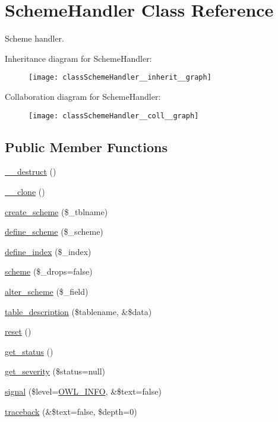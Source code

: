\section{SchemeHandler Class Reference}
\label{classSchemeHandler}


Scheme handler.  




Inheritance diagram for SchemeHandler:\nopagebreak
\begin{figure}[H]
\begin{center}
\leavevmode
\texttt{[image: classSchemeHandler\_\_inherit\_\_graph]}
\end{center}
\end{figure}


Collaboration diagram for SchemeHandler:\nopagebreak
\begin{figure}[H]
\begin{center}
\leavevmode
\texttt{[image: classSchemeHandler\_\_coll\_\_graph]}
\end{center}
\end{figure}
\subsection*{Public Member Functions}
\begin{DoxyCompactItemize}
\item 
\hyperlink{classSchemeHandler_a3d786efe6ef92858de21438b59774226}{\_\-\_\-destruct} ()
\item 
\hyperlink{classSchemeHandler_af0a48894ea6bb36f3149ccd40bf37681}{\_\-\_\-clone} ()
\item 
\hyperlink{classSchemeHandler_ae00497936108b220b41af512774cfc16}{create\_\-scheme} (\$\_\-tblname)
\item 
\hyperlink{classSchemeHandler_a07f6b7c5ac78e88f32584b90da53776b}{define\_\-scheme} (\$\_\-scheme)
\item 
\hyperlink{classSchemeHandler_a92adefff835050da61337524b9ae907b}{define\_\-index} (\$\_\-index)
\item 
\hyperlink{classSchemeHandler_a1e843dc411d175818c7b2ab5374f021e}{scheme} (\$\_\-drops=false)
\item 
\hyperlink{classSchemeHandler_aa8948e6382f7d19302a255ff0619765c}{alter\_\-scheme} (\$\_\-field)
\item 
\hyperlink{classSchemeHandler_a236edc61301c6926449e68385cc59a99}{table\_\-description} (\$tablename, \&\$data)
\item 
\hyperlink{classSchemeHandler_aa25feb4a70d67b3d571904be4b2f50bc}{reset} ()
\item 
\hyperlink{class__OWL_a99ec771fa2c5c279f80152cc09e489a8}{get\_\-status} ()
\item 
\hyperlink{class__OWL_adf9509ef96858be7bdd9414c5ef129aa}{get\_\-severity} (\$status=null)
\item 
\hyperlink{class__OWL_a51ba4a16409acf2a2f61f286939091a5}{signal} (\$level=\hyperlink{owl_8severitycodes_8php_a139328861128689f2f4def6a399d9057}{OWL\_\-INFO}, \&\$text=false)
\item 
\hyperlink{class__OWL_aa29547995d6741b7d2b90c1d4ea99a13}{traceback} (\&\$text=false, \$depth=0)
\end{DoxyCompactItemize}
